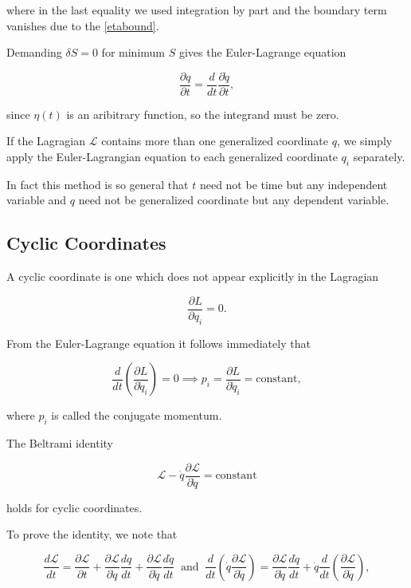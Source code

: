\documentclass[a4paper,12pt]{report}
\begin{document}
where in the last equality we used integration by part and the boundary term vanishes due to the \cref{etabound}. 

Demanding \(\delta S = 0\) for minimum \(S\) gives the Euler-Lagrange equation

\begin{equation}
	\frac{\partial q}{\partial t} = \frac{d}{dt} \frac{\partial \dot{q} }{\partial t},
\end{equation}

since \(\eta (t)\) is an aribitrary function, so the integrand must be zero. 

If the Lagragian \(\mathcal{L}\) contains more than one generalized coordinate \(q\), we simply apply the Euler-Lagrangian equation to each generalized coordinate \(q_{i} \) separately.   

In fact this method is so general that \(t\) need not be time but any independent variable and \(q\) need not be generalized coordinate but any dependent variable. 

\subsection{Cyclic Coordinates}

A cyclic coordinate is one which does not appear explicitly in the Lagragian 

\begin{equation}
	\frac{\partial L}{\partial q_{i} } = 0. 
\end{equation}

From the Euler-Lagrange equation it follows immediately that 

\begin{equation}
	\frac{d}{dt} \left( \frac{\partial L}{\partial \dot{q }_{i}   }  \right) = 0 \implies p_{i} = \frac{\partial L}{\partial \dot{q} _{i} }  = \text{constant},
\end{equation}

where \(p_{i} \) is called the conjugate momentum. 

The Beltrami identity

\begin{equation}
	\mathcal{L} - \dot{q} \frac{\partial \mathcal{L}}{\partial \dot{q} } = \text{constant}
\end{equation}

holds for cyclic coordinates.

To prove the identity, we note that 

\begin{equation}
	\frac{d \mathcal{L}}{dt} = \frac{\partial \mathcal{L}}{\partial t} + \frac{\partial \mathcal{L}}{\partial \dot{q} } \frac{dq}{dt} +  \frac{\partial \mathcal{L}}{\partial \dot{q} } \frac{d \dot{q} }{dt} ~\text { and }~ \frac{d}{dt}\left( \dot{q} \frac{\partial \mathcal{L}}{\partial \dot{q} }  \right) = \frac{\partial \mathcal{L}}{\partial \dot{q} } \frac{d \dot{q} }{dt} + \dot{q} \frac{d}{dt}\left( \frac{\partial \mathcal{L}}{\partial \dot{q} }  \right),
\end{equation}
\end{document}

